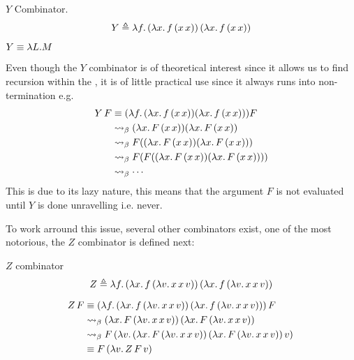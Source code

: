 \documentclass[12pt]{book}
\begin{document}
\begin{definition} $Y$ Combinator. 
\[
  Y \triangleq \lambda f.\, (\lambda x.\, f\, (x\, x))\, (\lambda x.\, f\, (x\, x))
\]
\end{definition}
\begin{note}
  \( Y \equiv \lambda L . M  \) 
\end{note}
\begin{remark}
  Even though the $Y$ combinator is of theoretical interest since it allows us to find recursion within the \lcalc, it is of little practical use since it always runs into non-termination e.g.
  \[
    \begin{aligned}
      Y \, F &\equiv (\lambda f. \, (\lambda x . \, f \, (x \, x))(\lambda x . \, f \, (x \, x))) F \\
      &\mathrel{\leadsto}_\beta (\lambda x . \, F \, (x \, x))(\lambda x . \, F \, (x \, x)) \\
             &\mathrel{\leadsto}_\beta F((\lambda x . \, F \, (x \, x))(\lambda x . \, F \, (x \, x))) \\
             &\mathrel{\leadsto}_\beta F(F((\lambda x . \, F \, (x \, x))(\lambda x . \, F \, (x \, x)))) \\
             &\mathrel{\leadsto}_\beta \cdots
    \end{aligned}
  \]
  This is due to its lazy nature, this means that the argument $F$ is not evaluated until $Y$ is done unravelling i.e. never.
\end{remark}
To work arround this issue, several other combinators exist, one of the most notorious, the $Z$ combinator is defined next:
\begin{definition} $Z$ combinator
\[
  Z \triangleq \lambda f.\, (\lambda x.\, f\, (\lambda v.\, x\, x\, v))\, (\lambda x.\, f\, (\lambda v.\, x\, x\, v))
\]
\end{definition}
\begin{example}
  \[
    \begin{aligned}
      Z \, F &\equiv (\lambda f.\, (\lambda x.\, f\, (\lambda v.\, x\, x\, v))\, (\lambda x.\, f\, (\lambda v.\, x\, x\, v)))\, F \\
             &\mathrel{\leadsto}_\beta (\lambda x.\, F\, (\lambda v.\, x\, x\, v))\, (\lambda x.\, F\, (\lambda v.\, x\, x\, v)) \\
             &\mathrel{\leadsto}_\beta F\, (\lambda v.\, (\lambda x.\, F\, (\lambda v.\, x\, x\, v))\, (\lambda x.\, F\, (\lambda v.\, x\, x\, v))\, v)\, \\
             &\equiv F\, (\lambda v.\, Z \, F \, v)\, \\
    \end{aligned}
  \]
\end{example}
  
\end{document}
